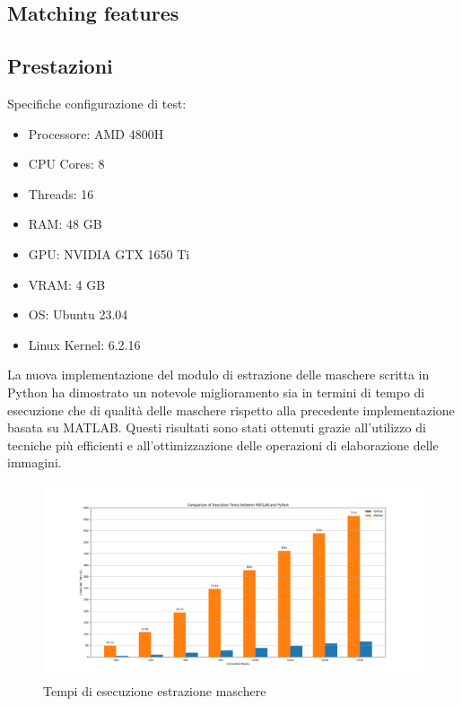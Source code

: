 \documentclass[a4paper,12pt]{report}
\begin{document}
    \subsection{Matching features}
    \newpage

    \subsection{Prestazioni}
    Specifiche configurazione di test:

    \begin{itemize}
      \item Processore: AMD 4800H
      \item CPU Cores: 8
      \item Threads: 16
      \item RAM: 48 GB
      \item GPU: NVIDIA GTX 1650 Ti
      \item VRAM: 4 GB
      \item OS: Ubuntu 23.04
      \item Linux Kernel: 6.2.16
    \end{itemize}

    La nuova implementazione del modulo di estrazione delle maschere scritta in Python ha dimostrato un notevole miglioramento sia in termini di tempo di esecuzione che di qualità delle maschere rispetto alla precedente implementazione basata su MATLAB. Questi risultati sono stati ottenuti grazie all'utilizzo di tecniche più efficienti e all'ottimizzazione delle operazioni di elaborazione delle immagini.

    \begin{figure}[H]
      \centering
      \includegraphics[width=\textwidth]{assets/images/results/result_execution_time.png}   
      \caption{Tempi di esecuzione estrazione maschere}
    \end{figure}
    
\end{document}

